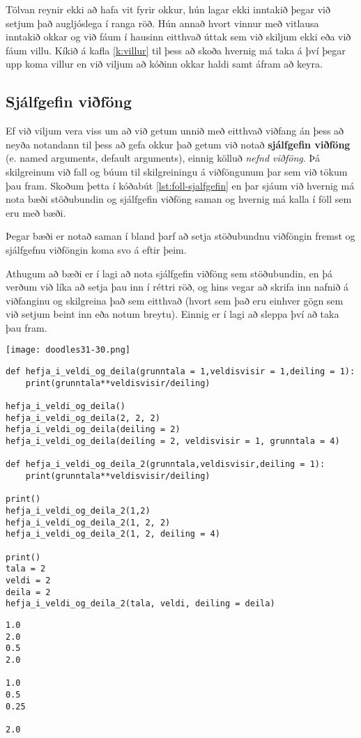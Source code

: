 Tölvan reynir ekki að hafa vit fyrir okkur, hún lagar ekki inntakið þegar við setjum það augljóslega í ranga röð.
Hún annað hvort vinnur með vitlausa inntakið okkar og við fáum í hausinn eitthvað úttak sem við skiljum ekki eða við fáum villu.
Kíkið á kafla \ref{k:villur} til þess að skoða hvernig má taka á því þegar upp koma villur en við viljum að kóðinn okkar haldi samt áfram að keyra.



\subsection{Sjálfgefin viðföng}\label{uk:föll-sjálfgefin}
Ef við viljum vera viss um að við getum unnið með eitthvað viðfang án þess að neyða notandann til þess að gefa okkur það getum við notað \textbf{sjálfgefin viðföng} (e. named arguments, default arguments), einnig kölluð \textit{nefnd viðföng}.
Þá skilgreinum við fall og búum til skilgreiningu á viðföngunum þar sem við tökum þau fram.
Skoðum þetta í kóðabút \ref{lst:foll-sjalfgefin} en þar sjáum við hvernig má nota bæði stöðubundin og sjálfgefin viðföng saman og hvernig má kalla í föll sem eru með bæði.

Þegar bæði er notað saman í bland þarf að setja stöðubundnu viðföngin fremst og sjálfgefnu viðföngin koma svo á eftir þeim.

Athugum að bæði er í lagi að nota sjálfgefin viðföng sem stöðubundin, en þá verðum við líka að setja þau inn í réttri röð, og hins vegar að skrifa inn nafnið á viðfanginu og skilgreina það sem eitthvað (hvort sem það eru einhver gögn sem við setjum beint inn eða notum breytu).
Einnig er í lagi að sleppa því að taka þau fram.

	\begin{center}
		\texttt{[image: doodles31-30.png]}
	\end{center}
\newpage
\begin{lstlisting}[caption=Sjálfgefin viðföng kynnt, label=lst:foll-sjalfgefin]
def hefja_i_veldi_og_deila(grunntala = 1,veldisvisir = 1,deiling = 1):	
	print(grunntala**veldisvisir/deiling)
	
hefja_i_veldi_og_deila()
hefja_i_veldi_og_deila(2, 2, 2)
hefja_i_veldi_og_deila(deiling = 2)
hefja_i_veldi_og_deila(deiling = 2, veldisvisir = 1, grunntala = 4)

def hefja_i_veldi_og_deila_2(grunntala,veldisvisir,deiling = 1):	
	print(grunntala**veldisvisir/deiling)

print()
hefja_i_veldi_og_deila_2(1,2) 
hefja_i_veldi_og_deila_2(1, 2, 2) 
hefja_i_veldi_og_deila_2(1, 2, deiling = 4) 

print()
tala = 2
veldi = 2
deila = 2
hefja_i_veldi_og_deila_2(tala, veldi, deiling = deila)
\end{lstlisting}
\lstset{style=uttak}
\begin{lstlisting}
1.0
2.0
0.5
2.0

1.0
0.5
0.25

2.0
\end{lstlisting}
\lstset{style=venjulegt}


